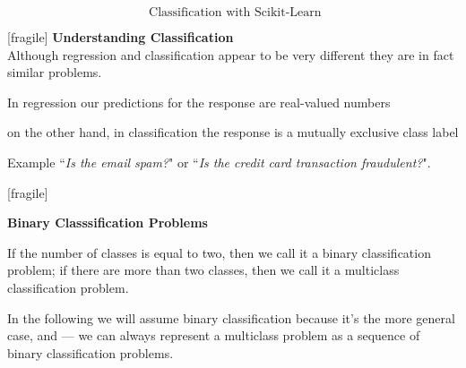 \documentclass[MASTER.tex]{subfiles}
\begin{document}
% 
%
% 
%  
%  
%
% 
% 
 
 \huge
\[ \mbox{ Classification with Scikit-Learn} \]
 
 [fragile]
\textbf{Understanding Classification}\\
Although regression and classification appear to be very different they are in fact similar problems.

 
\item In regression our predictions for the response are real-valued numbers
\item on the other hand, in classification the response is a mutually exclusive class label 
\item Example ``\textit{Is the email spam?}" or ``\textit{Is the credit card transaction fraudulent?}".
 

 
 [fragile]

   
  \textbf{Binary Classsification Problems}\\
   
\item If the number of classes is equal to two, then we call it a binary classification problem; if there are more than two classes, then we call it a multiclass classification problem.
\item  In the following we will assume binary classification because it’s the more general case, and — we can always represent a multiclass problem as a sequence of binary classification problems.
 
\end{document}
